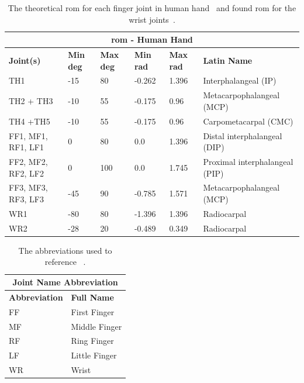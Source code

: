 \begin{table}[!h]
	\begin{center}
		\begin{tabular}{ |p{}|p{}|p{}|p{}|p{}|p{}| } 
		\hline
		\multicolumn{6}{|c|}{\textbf{\gls{rom} - Human Hand}} \\ \hline
		\textbf{Joint(s)} & \textbf{Min deg} & \textbf{Max deg} & \textbf{Min rad} & \textbf{Max rad} & \textbf{Latin Name} \\ \hline
		TH1                & -15 & 80  & -0.262 & 1.396 & Interphalangeal (IP) \\ \hline
		TH2 + TH3          & -10 & 55  & -0.175 & 0.96 & Metacarpophalangeal (MCP)\\ \hline
		TH4 +TH5           & -10 & 55  & -0.175 & 0.96 & Carpometacarpal (CMC)\\ \hline
		FF1, MF1, RF1, LF1 & 0   & 80  & 0.0 & 1.396 & Distal interphalangeal (DIP) \\ \hline
		FF2, MF2, RF2, LF2 & 0   & 100 & 0.0 & 1.745 & Proximal interphalangeal (PIP) \\ \hline
		FF3, MF3, RF3, LF3 & -45 & 90  & -0.785 & 1.571 & Metacarpophalangeal (MCP) \\ \hline
		WR1                &-80  & 80  & -1.396 & 1.396 & Radiocarpal \\ \hline
		WR2                &-28  & 20  & -0.489 & 0.349 & Radiocarpal \\ \hline
		\end{tabular}
		\caption{The theoretical \gls{rom} for each finger joint in human hand~\cite{continuous-and-simultaneous-estimation-of-finger-kinematics-using-inputs-from-an-emg-to-muscle-activation-model} and found \gls{rom} for the wrist joints~\cite{functional-wrist-motion:-a-biomechanical-study}.}
		\label{app:range-of-motion-human-hand}
	\end{center}
\end{table}

\begin{table}[!h]
	\begin{center}
		\begin{tabular}{ |l|l| } 
		\hline
		\multicolumn{2}{|c|}{\textbf{Joint Name Abbreviation}} \\ \hline
		\textbf{Abbreviation} & \textbf{Full Name} \\ \hline
		FF & First Finger \\ \hline 
		MF & Middle Finger \\ \hline 
		RF & Ring Finger \\ \hline 
		LF & Little Finger \\ \hline 
		WR & Wrist \\ \hline 
		\end{tabular}
		\caption{The abbreviations used to reference ~\cite{joint-abbreviations-shadow-hand}.}
		\label{app:joint-abbreviations}
	\end{center}
	\end{table}

